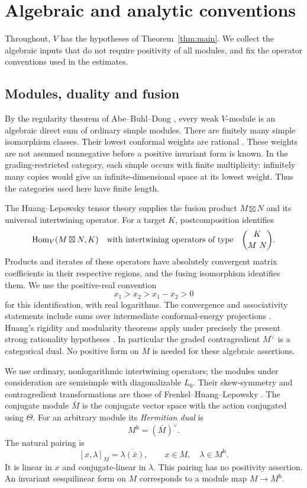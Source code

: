 \section{Algebraic and analytic conventions}\label{sec:preliminaries}

Throughout, $V$ has the hypotheses of Theorem~\ref{thm:main}. We collect the algebraic inputs that do not require positivity of all modules, and fix the operator conventions used in the estimates.

\subsection{Modules, duality and fusion}

By the regularity theorem of Abe--Buhl--Dong \cite[Theorem~4.5]{ABD}, every weak $V$-module is an algebraic direct sum of ordinary simple modules. There are finitely many simple isomorphism classes. Their lowest conformal weights are rational \cite[Theorem~11.3]{DLMModularInvariance}. These weights are not assumed nonnegative before a positive invariant form is known. In the grading-restricted category, each simple occurs with finite multiplicity: infinitely many copies would give an infinite-dimensional space at its lowest weight. Thus the categories used here have finite length.

The Huang--Lepowsky tensor theory supplies the fusion product $M\boxtimes N$ and its universal intertwining operator. For a target $K$, postcomposition identifies
\[
 \operatorname{Hom}_V(M\boxtimes N,K)
 \quad\text{with intertwining operators of type}\quad
 \binom{K}{M\ N}.
\]
Products and iterates of these operators have absolutely convergent matrix coefficients in their respective regions, and the fusing isomorphism identifies them. We use the positive-real convention
\[
 x_1>x_2>x_1-x_2>0
\]
for this identification, with real logarithms. The convergence and associativity statements include sums over intermediate conformal-energy projections \cite[Theorems~3.5 and~3.7, Remark~3.8]{HuangTensor}. Huang's rigidity and modularity theorems apply under precisely the present strong rationality hypotheses \cite[Theorems~1.1, 3.8 and~4.6]{HuangRigidity}. In particular the graded contragredient $M^\vee$ is a categorical dual. No positive form on $M$ is needed for these algebraic assertions.

We use ordinary, nonlogarithmic intertwining operators; the modules under consideration are semisimple with diagonalizable $L_0$. Their skew-symmetry and contragredient transformations are those of Frenkel--Huang--Lepowsky \cite{FHL}. The conjugate module $\bar M$ is the conjugate vector space with the action conjugated using $\Theta$. For an arbitrary module its \emph{Hermitian dual} is
\[
 M^{\mathrm h}=(\bar M)^\vee.
\]
The natural pairing is
\begin{equation}\label{eq:hermitian-pairing}
 [x,\lambda]_M=\overline{\lambda(\bar x)},
 \qquad x\in M,\quad\lambda\in M^{\mathrm h}.
\end{equation}
It is linear in $x$ and conjugate-linear in $\lambda$. This pairing has no positivity assertion. An invariant sesquilinear form on $M$ corresponds to a module map $M\to M^{\mathrm h}$.

